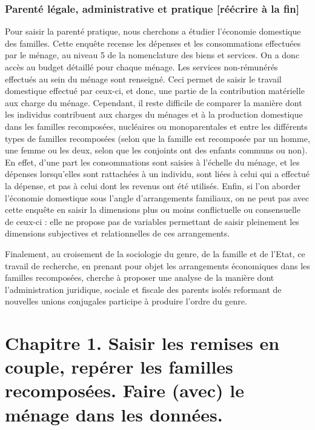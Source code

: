 \documentclass[
  12pt,
]{book}
\begin{document}
\subsection{Parenté légale, administrative et pratique {[}réécrire à la
fin{]}}\label{parentuxe9-luxe9gale-administrative-et-pratique-ruxe9uxe9crire-uxe0-la-fin}

Pour saisir la parenté pratique, nous cherchons a étudier l'économie
domestique des familles. Cette enquête recense les dépenses et les
consommations effectuées par le ménage, au niveau 5 de la nomenclature
des biens et services. On a donc accès au budget détaillé pour chaque
ménage. Les services non-rémunérés effectués au sein du ménage sont
renseigné. Ceci permet de saisir le travail domestique effectué par
ceux-ci, et donc, une partie de la contribution matérielle aux charge du
ménage. Cependant, il reste difficile de comparer la manière dont les
individus contribuent aux charges du ménages et à la production
domestique dans les familles recomposées, nucléaires ou monoparentales
et entre les différents types de familles recomposées (selon que la
famille est recomposée par un homme, une femme ou les deux, selon que
les conjoints ont des enfants communs ou non). En effet, d'une part les
consommations sont saisies à l'échelle du ménage, et les dépenses
lorsqu'elles sont rattachées à un individu, sont liées à celui qui a
effectué la dépense, et pas à celui dont les revenus ont été utilisés.
Enfin, si l'on aborder l'économie domestique sous l'angle d'arrangements
familiaux, on ne peut pas avec cette enquête en saisir la dimensions
plus ou moins conflictuelle ou consensuelle de ceux-ci : elle ne propose
pas de variables permettant de saisir pleinement les dimensions
subjectives et relationnelles de ces arrangements.

Finalement, au croisement de la sociologie du genre, de la famille et de
l'Etat, ce travail de recherche, en prenant pour objet les arrangements
économiques dans les familles recomposées, cherche à proposer une
analyse de la manière dont l'administration juridique, sociale et
fiscale des parents isolés reformant de nouvelles unions conjugales
participe à produire l'ordre du genre.

\chapter{Chapitre 1. Saisir les remises en couple, repérer les familles
recomposées. Faire (avec) le ménage dans les
données.}\label{chapitre-1.-saisir-les-remises-en-couple-repuxe9rer-les-familles-recomposuxe9es.-faire-avec-le-muxe9nage-dans-les-donnuxe9es.}
\end{document}
